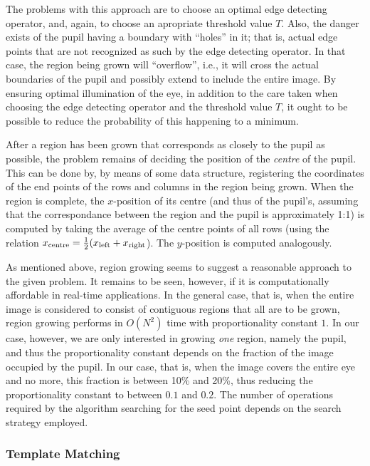The problems with this approach are to choose an optimal edge
detecting operator, and, again, to choose an apropriate threshold
value $T$.  Also, the danger exists of the pupil having a boundary
with ``holes'' in it; that is, actual edge points that are not
recognized as such by the edge detecting operator.  In that case, the
region being grown will ``overflow'', i.e., it will cross the actual
boundaries of the pupil and possibly extend to include the entire
image.  By ensuring optimal illumination of the eye, in addition to
the care taken when choosing the edge detecting operator and the
threshold value $T$, it ought to be possible to reduce the probability
of this happening to a minimum.

After a region has been grown that corresponds as closely to the pupil
as possible, the problem remains of deciding the position of the {\em
  centre\/} of the pupil.  This can be done by, by means of some data
structure, registering the coordinates of the end points of the rows
and columns in the region being grown.  When the region is complete,
the $x$-position of its centre (and thus of the pupil's, assuming that
the correspondance between the region and the pupil is approximately
1:1) is computed by taking the average of the centre points of all
rows (using the relation $x_{\mbox{\scriptsize centre}}=\frac{1}{2}
(x_{\mbox{\scriptsize left}}+x_{\mbox{\scriptsize right}}$).  The
$y$-position is computed analogously.

As mentioned above, region growing seems to suggest a reasonable
approach to the given problem.  It remains to be seen, however, if it
is computationally affordable in real-time applications.  In the
general case, that is, when the entire image is considered to consist
of contiguous regions that all are to be grown, region growing
performs in $O(N^{2})$ time with proportionality constant $1$.  In our
case, however, we are only interested in growing {\em one\/} region,
namely the pupil, and thus the proportionality constant depends on the
fraction of the image occupied by the pupil.  In our case, that is,
when the image covers the entire eye and no more, this fraction is
between 10\% and 20\%, thus reducing the proportionality constant to
between $0.1$ and $0.2$.  The number of operations required by the
algorithm searching for the seed point depends on the search strategy
employed.

\subsubsection{Template Matching}

